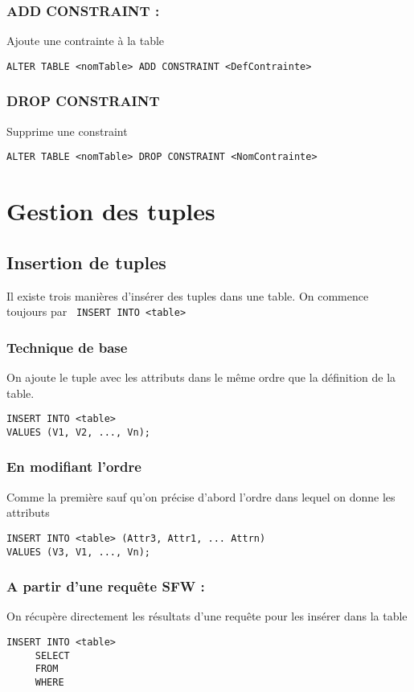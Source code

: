 \documentclass[10pt,a4paper,twoside]{article}
\begin{document}
\subsubsection{ADD CONSTRAINT :} 
Ajoute une contrainte à la table
\begin{verbatim}
ALTER TABLE <nomTable> ADD CONSTRAINT <DefContrainte> 
\end{verbatim}

\subsubsection{DROP CONSTRAINT} 
Supprime une constraint
\begin{verbatim}
ALTER TABLE <nomTable> DROP CONSTRAINT <NomContrainte>
\end{verbatim}

\section{Gestion des tuples}

\subsection{Insertion de tuples}
Il existe trois manières d'insérer des tuples dans une table. On commence toujours par \verb= INSERT INTO <table>=

\subsubsection{Technique de base} 
On ajoute le tuple avec les attributs dans le même ordre que la définition de la table.
\begin{verbatim}
INSERT INTO <table>
VALUES (V1, V2, ..., Vn);
\end{verbatim}

\subsubsection{En modifiant l'ordre} 
Comme la première sauf qu'on précise d'abord l'ordre dans lequel on donne les attributs
\begin{verbatim}
INSERT INTO <table> (Attr3, Attr1, ... Attrn) 
VALUES (V3, V1, ..., Vn);
\end{verbatim}

\subsubsection{A partir d'une requête SFW :} 
On récupère directement les résultats d'une requête pour les insérer dans la table
\begin{verbatim}
INSERT INTO <table> 
     SELECT
     FROM
     WHERE
\end{verbatim}
\end{document}
